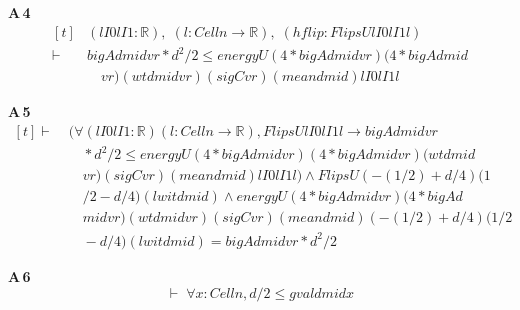 \noindent\textbf{A\,4}\quad{}
{\footnotesize\[ \begin{aligned}[t]
&(\mathit{lI0} \mathit{lI1} : \mathbb{R} ),\; (\mathit{l} : \mathit{Cell} \mathit{n} \to \mathbb{R} ),\; (\mathit{hflip} : \mathit{FlipsU} \mathit{lI0} \mathit{lI1} \mathit{l})\\
\vdash\;&\mathit{bigA} \mathit{d} \mathit{mid} \mathit{vr} * \mathit{d} ^{2} / 2 \leq \mathit{energyU} (4 * \mathit{bigA} \mathit{d} \mathit{mid} \mathit{vr}) (4 * \mathit{bigA} \mathit{d} \mathit{mid}\\
&\quad \mathit{vr}) (\mathit{wt} \mathit{d} \mathit{mid} \mathit{vr}) (\mathit{sigC} \mathit{vr}) (\mathit{mean} \mathit{d} \mathit{mid}) \mathit{lI0} \mathit{lI1} \mathit{l}
\end{aligned} \]}

\noindent\textbf{A\,5}\quad{}
{\footnotesize\[ \begin{aligned}[t]
\vdash\;&(\forall (\mathit{lI0} \mathit{lI1} : \mathbb{R} ) (\mathit{l} : \mathit{Cell} \mathit{n} \to \mathbb{R} ), \mathit{FlipsU} \mathit{lI0} \mathit{lI1} \mathit{l} \to \mathit{bigA} \mathit{d} \mathit{mid} \mathit{vr}\\
&\quad * \mathit{d} ^{2} / 2 \leq \mathit{energyU} (4 * \mathit{bigA} \mathit{d} \mathit{mid} \mathit{vr}) (4 * \mathit{bigA} \mathit{d} \mathit{mid} \mathit{vr}) (\mathit{wt} \mathit{d} \mathit{mid}\\
&\quad \mathit{vr}) (\mathit{sigC} \mathit{vr}) (\mathit{mean} \mathit{d} \mathit{mid}) \mathit{lI0} \mathit{lI1} \mathit{l}) \wedge \mathit{FlipsU} (-(1/2) + \mathit{d}/4) (1\\
&\quad /2 - \mathit{d}/4) (\mathit{lwit} \mathit{d} \mathit{mid}) \wedge \mathit{energyU} (4 * \mathit{bigA} \mathit{d} \mathit{mid} \mathit{vr}) (4 * \mathit{bigA} \mathit{d}\\
&\quad \mathit{mid} \mathit{vr}) (\mathit{wt} \mathit{d} \mathit{mid} \mathit{vr}) (\mathit{sigC} \mathit{vr}) (\mathit{mean} \mathit{d} \mathit{mid}) (-(1/2) + \mathit{d}/4) (1/2\\
&\quad - \mathit{d}/4) (\mathit{lwit} \mathit{d} \mathit{mid}) = \mathit{bigA} \mathit{d} \mathit{mid} \mathit{vr} * \mathit{d} ^{2} / 2
\end{aligned} \]}

\noindent\textbf{A\,6}\quad{}
{\footnotesize\[ \vdash\; \forall \mathit{x} : \mathit{Cell} \mathit{n}, \mathit{d} / 2 \leq \mathit{gval} \mathit{d} \mathit{mid} \mathit{x} \]}

